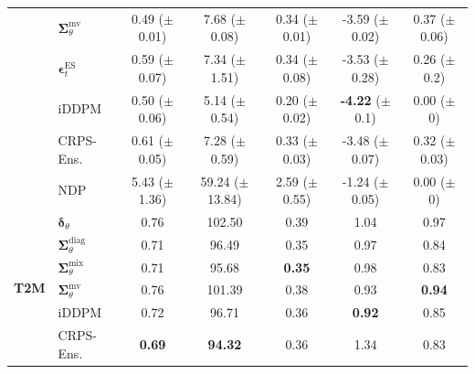 \begin{tabular}{|l|l|ccccc|}
        & $\bm\Sigma_\theta^{\mathrm{mv}}$ & \makecell{0.49 \\ ($\pm$ 0.01)} & \makecell{7.68 \\ ($\pm$ 0.08)} & \makecell{0.34 \\ ($\pm$ 0.01)} & \makecell{-3.59 \\ ($\pm$ 0.02)} & \makecell{0.37 \\ ($\pm$ 0.06)} \\
        & $\bm\epsilon_t^\mathrm{ES}$ & \makecell{0.59 \\ ($\pm$ 0.07)} & \makecell{7.34 \\ ($\pm$ 1.51)} & \makecell{0.34 \\ ($\pm$ 0.08)} & \makecell{-3.53 \\ ($\pm$ 0.28)} & \makecell{0.26 \\ ($\pm$ 0.2)} \\
        & iDDPM & \makecell{0.50 \\ ($\pm$ 0.06)} & \makecell{5.14 \\ ($\pm$ 0.54)} & \makecell{0.20 \\ ($\pm$ 0.02)} & \makecell{\textbf{-4.22} \\ ($\pm$ 0.1)} & \makecell{0.00 \\ ($\pm$ 0)} \\
        & CRPS-Ens. & \makecell{0.61 \\ ($\pm$ 0.05)} & \makecell{7.28 \\ ($\pm$ 0.59)} & \makecell{0.33 \\ ($\pm$ 0.03)} & \makecell{-3.48 \\ ($\pm$ 0.07)} & \makecell{0.32 \\ ($\pm$ 0.03)} \\
        & NDP & \makecell{5.43 \\ ($\pm$ 1.36)} & \makecell{59.24 \\ ($\pm$ 13.84)} & \makecell{2.59 \\ ($\pm$ 0.55)} & \makecell{-1.24 \\ ($\pm$ 0.05)} & \makecell{0.00 \\ ($\pm$ 0)} \\
        \midrule
        \multirow{6}{*}{\textbf{T2M}}
        & $\bm\delta_\theta$ & 0.76 & 102.50 & 0.39 & 1.04 & 0.97 \\
        & $\bm\Sigma_\theta^{\mathrm{diag}}$ & 0.71 & 96.49 & 0.35 & 0.97 & 0.84 \\
        & $\bm\Sigma_\theta^{\mathrm{mix}}$ & 0.71 & 95.68 & \textbf{0.35} & 0.98 & 0.83 \\
        & $\bm\Sigma_\theta^{\mathrm{mv}}$ & 0.76 & 101.39 & 0.38 & 0.93 & \textbf{0.94} \\
        & iDDPM & 0.72 & 96.71 & 0.36 & \textbf{0.92} & 0.85 \\
        & CRPS-Ens. & \textbf{0.69} & \textbf{94.32} & 0.36 & 1.34 & 0.83 \\
        \bottomrule
    \end{tabular}
